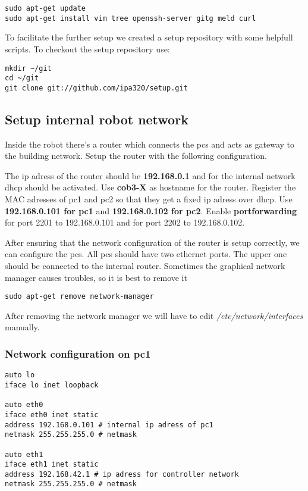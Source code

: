 \begin{lstlisting}
sudo apt-get update
sudo apt-get install vim tree openssh-server gitg meld curl
\end{lstlisting}

To facilitate the further setup we created a setup repository with some helpfull scripts. To checkout the setup repository use:

\begin{lstlisting}
mkdir ~/git
cd ~/git
git clone git://github.com/ipa320/setup.git
\end{lstlisting}

\subsection{Setup internal robot network}
Inside the robot there's a router which connects the pcs and acts as gateway to the building network. Setup the router with the following configuration. 

The ip adress of the router should be \textbf{192.168.0.1} and for the internal network dhcp should be activated. Use \textbf{cob3-X} as hostname for the router. Register the MAC adresses of pc1 and pc2 so that they get a fixed ip adress over dhcp. Use \textbf{192.168.0.101 for pc1} and \textbf{192.168.0.102 for pc2}. Enable \textbf{portforwarding} for port 2201 to 192.168.0.101 and for port 2202 to 192.168.0.102.

After ensuring that the network configuration of the router is setup correctly, we can configure the pcs. All pcs should have two ethernet ports. The upper one should be connected to the internal router. Sometimes the graphical network manager causes troubles, so it is best to remove it

\begin{lstlisting}
sudo apt-get remove network-manager
\end{lstlisting}

After removing the network manager we will have to edit \textit{/etc/network/interfaces} manually. 

\subsubsection{Network configuration on pc1}

\begin{lstlisting}
auto lo
iface lo inet loopback

auto eth0
iface eth0 inet static
address 192.168.0.101 # internal ip adress of pc1
netmask 255.255.255.0 # netmask

auto eth1
iface eth1 inet static
address 192.168.42.1 # ip adress for controller network
netmask 255.255.255.0 # netmask
\end{lstlisting}

